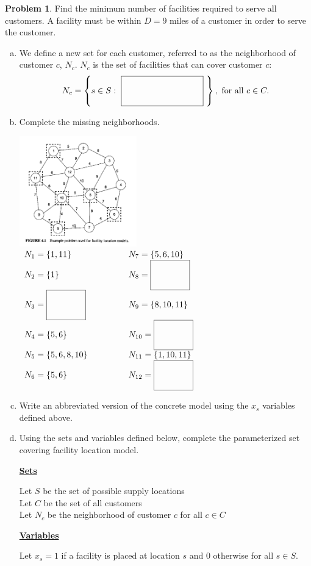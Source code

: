 \documentclass[11pt]{article}
\theoremstyle{definition}
\newtheorem{problem}{Problem}
\newcommand{\answerbox}[3]{%
  \fbox{%
    \begin{minipage}[#1]{#2}
      \hfill\vspace{#3}
    \end{minipage}
  }
}
\newcommand{\wordbox}{\answerbox{c}{1.2in}{1cm}}
\newcommand{\catbox}{\answerbox{c}{.5in}{1cm}}
\begin{document}
\begin{problem}
Find the minimum number of facilities required to serve all customers.  A facility must be within $D = 9$ miles of a customer in order to serve the customer.

\begin{enumerate}[(a)]
\item We define a new set for each customer, referred to as the neighborhood of customer $c$, $N_c$. $N_c$ is the set of facilities that can cover customer $c$:  
\[  N_c = \left\{s \in S: ~\wordbox~\right\}, \text{ for all } c \in C.  \]
\item Complete the missing neighborhoods.   

\def\arraystretch{2.2}
\begin{multicols}{2}
\includegraphics[width = 0.4\textwidth]{facloc}
$
\begin{array}{ll}
N_1 = \{1, 11\} \hspace{2cm} & N_7 = \{5, 6, 10\} \\
N_2 = \{1\} & N_8 = \catbox \\
N_3 = \catbox  & N_9 = \{8,10,11\} \\
N_4 = \{5,6\} & N_{10} = \catbox \\
N_5 = \{5,6,8,10\} & N_{11} = \{1,10,11\} \\
N_6 = \{5,6\} & N_{12}= \catbox \\
\end{array}
$
\end{multicols}
\item Write an abbreviated version of the concrete model using the $x_s$ variables defined above.


\newpage

\item Using the sets and variables defined below, complete the parameterized set covering facility location model.

\textbf{\underline{Sets}}

Let $S$ be the set of possible supply locations\\
Let $C$ be the set of all customers \\
Let $N_c$ be the neighborhood of customer $c$ for all $c \in C$


\textbf{\underline{Variables}}

Let $x_s = 1$ if a facility is placed at location $s$ and 0 otherwise for all $s \in S$.
\end{enumerate}
\end{problem}
\end{document}
